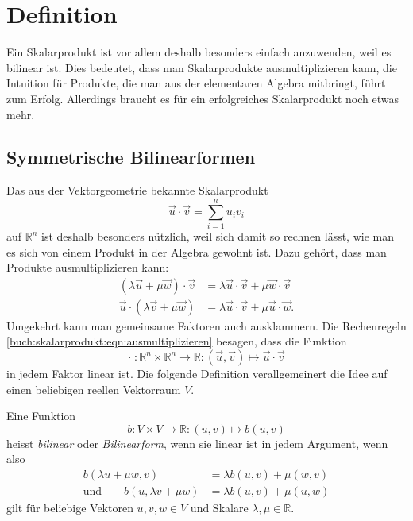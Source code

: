 %
%
%
\section{Definition
\label{buch:skalarprodukte:section:definition}}
Ein Skalarprodukt ist vor allem deshalb besonders einfach anzuwenden,
weil es bilinear ist.
Dies bedeutet, dass man Skalarprodukte ausmultiplizieren kann, die
Intuition für Produkte, die man aus der elementaren Algebra mitbringt,
führt zum Erfolg.
Allerdings braucht es für ein erfolgreiches Skalarprodukt noch
etwas mehr.

%
%
\subsection{Symmetrische Bilinearformen}
Das aus der Vektorgeometrie bekannte Skalarprodukt
%
%
\[
\vec{u}\cdot \vec{v}
=
\sum_{i=1}^n u_iv_i
\]
auf $\mathbb{R}^n$ ist deshalb besonders nützlich, weil sich damit
so rechnen lässt, wie man es sich von einem Produkt in der Algebra
gewohnt ist.
Dazu gehört, dass man Produkte ausmultiplizieren kann:
\begin{equation}
\begin{aligned}
(\lambda\vec{u}+\mu\vec{w})\cdot\vec{v}
&=
\lambda\vec{u}\cdot\vec{v}+\mu\vec{w}\cdot\vec{v}
\\
\vec{u}\cdot(\lambda\vec{v}+\mu\vec{w})
&=
\lambda\vec{u}\cdot\vec{v}+\mu\vec{u}\cdot\vec{w}.
\end{aligned}
\label{buch:skalarprodukt:eqn:ausmultiplizieren}
\end{equation}
Umgekehrt kann man gemeinsame Faktoren auch ausklammern.
Die Rechenregeln \eqref{buch:skalarprodukt:eqn:ausmultiplizieren}
besagen, dass die Funktion
\[
\cdot
\;
\colon
\mathbb{R}^n \times \mathbb{R}^n
\to
\mathbb{R}
:
(\vec{u},\vec{v}) \mapsto \vec{u}\cdot\vec{v}
\]
in jedem Faktor linear ist.
Die folgende Definition verallgemeinert die Idee auf einen
beliebigen reellen Vektorraum $V$.

\begin{definition}
Eine Funktion
\[
b\colon
V\times V \to \mathbb{R}
:
(u,v) \mapsto b(u,v)
\]
heisst {\em bilinear} oder {\em Bilinearform},
wenn sie linear ist in jedem Argument, wenn also
%
%
\[
\begin{aligned}
b(\lambda u+\mu w,v) &= \lambda b(u,v) + \mu(w,v)
\\
\text{und}\qquad
b(u,\lambda v+\mu w) &= \lambda b(u,v) + \mu(u,w)
\end{aligned}
\]
gilt für beliebige Vektoren $u,v,w\in V$ und Skalare
$\lambda,\mu\in\mathbb{R}$.
\end{definition}

